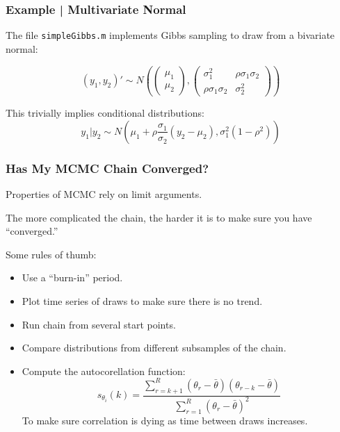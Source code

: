 \documentclass[11pt, aspectratio=169]{beamer}
\newcommand{\Skip}{\vspace{1em}}
\begin{document}
\begin{frame}[c]\frametitle{Example | Multivariate Normal}
    
The file {\tt simpleGibbs.m} implements Gibbs sampling to draw from a bivariate normal: 

$$(y_1, y_2)' \sim N\left( \begin{pmatrix} \mu_1 \\ \mu_2 \end{pmatrix}, \begin{pmatrix} \sigma_1^2 & \rho \sigma_1 \sigma_2 \\ \rho \sigma_1 \sigma_2 & \sigma_2^2 \end{pmatrix} \right) $$

This trivially implies conditional distributions: 
$$y_1 | y_2 \sim N(\mu_1 + \rho \frac{\sigma_1}{\sigma_2}(y_2 - \mu_2), \sigma_1^2(1 - \rho^2))$$



\end{frame}


\begin{frame}[c]\frametitle{Has My MCMC Chain Converged?}
    
Properties of MCMC rely on limit arguments.  

\Skip
The more complicated the chain, the harder it is to make sure you have ``converged.''    


\Skip
Some rules of thumb:
\begin{itemize}
  \item Use a ``burn-in'' period. 
  \item Plot time series of draws to make sure there is no trend. 
  \item Run chain from several start points. 
  \item Compare distributions from different subsamples of the chain. 
  \item Compute the autocorellation function: 
$$s_{\theta_i}(k) = \frac{ \sum_{r = k+1}^R (\theta_r - \bar{\theta})(\theta_{r-k} - \bar{\theta})}{ \sum_{r=1}^R  (\theta_r - \bar{\theta})^2} $$
To make sure correlation is dying as time between draws increases. 
\end{itemize}    


\end{frame}
\end{document}
